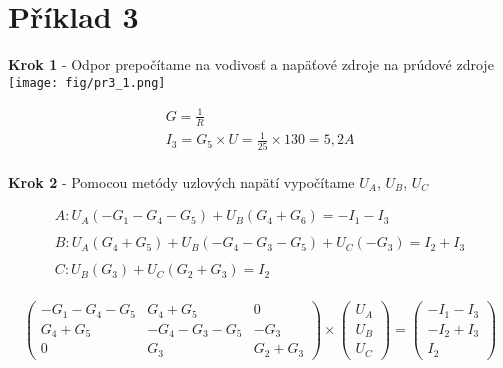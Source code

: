 \section{Příklad 3}

\begin{center}
    \textbf{Krok 1} - Odpor prepočítame na vodivosť a napäťové zdroje na prúdové zdroje
    \texttt{[image: fig/pr3\_1.png]} \\
\end{center}

\begin{gather*}
    G = \frac {1} {R} \\
    I_3 = G_5 \times U = \frac {1} {25} \times 130 = 5,2 A \\
\end{gather*}

\newpage

\begin{center}
    \textbf{Krok 2} - Pomocou metódy uzlových napätí vypočítame $U_{A}$, $U_{B}$, $U_{C}$ 
\end{center}

\begin{gather*}
   A:  U_A(-G_1 - G_4 - G_5) + U_B(G_4 + G_6) = -I_1 - I_3 \\\\
   B:  U_A(G_4 + G_5) + U_B(-G_4 - G_3 - G_5) + U_C(-G_3) = I_2 + I_3 \\\\
   C:  U_B(G_3) + U_C(G_2 + G_3) = I_2 \\
\end{gather*}

\begin{equation*}
\begin{pmatrix}
-G_1 - G_4 - G_5 & G_4 + G_5 & 0 \\
G_4 + G_5 & -G_4 - G_3 - G_5 & -G_3 \\
0 & G_3 & G_2 + G_3 
\end{pmatrix}
\times
\begin{pmatrix}
U_A \\
U_B \\
U_C 
\end{pmatrix}
=
\begin{pmatrix}
-I_1 - I_3 \\
-I_2 + I_3 \\
I_2
\end{pmatrix}
\end{equation*}
\\

